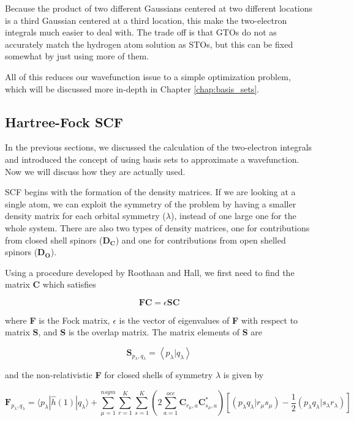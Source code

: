 Because the product of two different Gaussians centered at two different locations is a third Gaussian centered at a third location, this make the two-electron integrals much easier to deal with. The trade off is that GTOs do not as accurately match the hydrogen atom solution as STOs, but this can be fixed somewhat by just using more of them.

All of this reduces our wavefunction issue to a simple optimization problem, which will be discussed more in-depth in Chapter \ref{chap:basis_sets}.

\subsection{Hartree-Fock SCF}
In the previous sections, we discussed the calculation of the two-electron integrals and introduced the concept of using basis sets to approximate a wavefunction. Now we will discuss how they are actually used. 

SCF begins with the formation of the density matrices. If we are looking at a single atom, we can exploit the symmetry of the problem by having a smaller density matrix for each orbital symmetry ($\lambda$), instead of one large one for the whole system. There are also two types of density matrices, one for contributions from closed shell spinors (\textbf{D$_\textbf{C}$}) and one for contributions from open shelled spinors (\textbf{D$_\textbf{O}$}).

Using a procedure developed by Roothaan and Hall\cite{RHF, Hall541}, we first need to find the matrix \textbf{C} which satisfies 

\begin{equation}
\label{RHE}
\textbf{FC} = \epsilon{}\textbf{SC}
\end{equation}

where \textbf{F} is the Fock matrix, $\epsilon$ is the vector of eigenvalues of \textbf{F} with respect to matrix \textbf{S}, and \textbf{S} is the overlap matrix. The matrix elements of \textbf{S} are

\begin{equation}
\label{eq:smat}
\textbf{S}_{p_{\lambda}, q_{\lambda}} = \left<p_{\lambda}|q_{\lambda}\right>
\end{equation}

and the non-relativistic \textbf{F} for closed shells of symmetry $\lambda$ is given by

\begin{equation}
\label{FOCKM}
\textbf{F}_{p_{\lambda},q_{\lambda}} = \langle p_{\lambda}|\hat{h}(1)|q_{\lambda}\rangle + \sum^{nsym}_{\mu=1}\sum^{K}_{r=1}\sum^{K}_{s=1}\left( 2\sum^{occ}_{a=1}\textbf{C}_{r_{\mu},a}\textbf{C}^{*}_{s_{\mu}, a}\right)
				\left[\left( p_{\lambda}q_{\lambda}|r_{\mu}s_{\mu}\right) - \frac{1}{2}\left( p_{\lambda}q_{\lambda}|s_{\lambda}r_{\lambda}\right)\right]
\end{equation}

